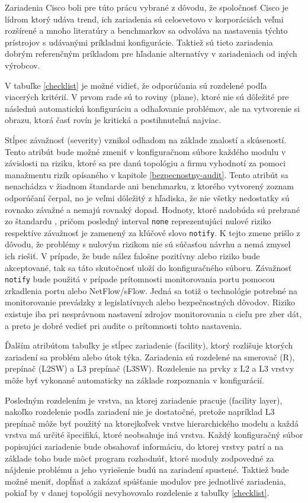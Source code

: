 Zariadenia Cisco boli pre túto prácu vybrané z dôvodu, že spoločnosť Cisco je lídrom ktorý udáva trend, ich zariadenia sú celosvetovo v korporáciách veľmi rozšírené a mnoho literatúry a benchmarkov sa odvoláva na nastavenia týchto prístrojov s udávanými príkladmi konfigurácie. Taktiež sú tieto zariadenia dobrým referenčným príkladom pre hľadanie alternatívy v zariadeniach od iných výrobcov.

V tabuľke \ref{checklist} je možné vidieť, že odporúčania sú rozdelené podľa viacerých kritérií. V prvom rade sú to roviny (plane), ktoré nie sú dôležité pre následnú automatickú konfiguráciu a odhaľovanie problémov, ale na vytvorenie si obrazu, ktorá časť rovín je kritická a postihnuteľná najviac. 

Stĺpec závažnosť (severity) vznikol odhadom na základe znalostí a skúseností. Tento atribút bude možné zmeniť v konfiguračnom súbore každého modulu v závislosti na riziku, ktoré sa pre danú topológiu a firmu vyhodnotí za pomoci manažmentu rizík opísaného v kapitole \ref{bezpecnostny-audit}. Tento atribút sa nenachádza v žiadnom štandarde ani benchmarku, z ktorého vytvorený zoznam odporúčaní čerpal, no je veľmi dôležitý z hľadiska, že nie všetky nedostatky sú rovnako závažné a nemajú rovnaký dopad. Hodnoty, ktoré nadobúda sú prebrané zo štandardu , pričom posledný interval \texttt{none} reprezentujúci nulové riziko respektíve závažnosť je zamenený za kľúčové slovo \texttt{notify}. K tejto zmene prišlo z dôvodu, že problémy s nulovým rizikom nie sú súčasťou návrhu a nemá zmysel ich riešiť. V prípade, že bude nález falošne pozitívny alebo riziko bude akceptované, tak sa táto skutočnosť uloží do konfiguračného súboru. Závažnosť \texttt{notify} bude použitá v prípade prítomnosti monitorovania portu pomocou zrkadlenia portu alebo NetFlow/sFlow. Jedná sa totiž o technológie potrebné na monitorovanie prevádzky z legislatívnych alebo bezpečnostných dôvodov. Riziko existuje iba pri nesprávnom nastavení zdrojov monitorovania a cieľu pre zber dát, a preto je dobré vedieť pri audite o prítomnosti tohto nastavenia.
 

Ďalším atribútom tabuľky je stĺpec zariadenie (facility), ktorý rozlišuje ktorých zariadení sa problém alebo útok týka. Zariadenia sú rozdelené na smerovač (R), prepínač (L2SW) a L3 prepínač (L3SW). Rozdelenie na prvky z L2 a L3 vrstvy môže byť vykonané automaticky na základe rozpoznania v konfigurácií.

Posledným rozdelením je vrstva, na ktorej zariadenie pracuje (facility layer), nakoľko rozdelenie podľa zariadení nie je dostatočné, pretože napríklad L3 prepínač môže byť použitý na ktorejkoľvek vrstve hierarchického modelu a každá vrstva má určité špecifiká, ktoré neobsahuje iná vrstva. Každý konfiguračný súbor popisujúci zariadenie bude obsahovať informáciu, do ktorej vrstvy patrí a na základe toho bude môcť program rozhodnúť, ktoré moduly zodpovedné za nájdenie problému a jeho vyriešenie budú na zariadení spustené. Taktiež bude možné meniť, dopĺňať a zakázať spúšťanie modulov pre jednotlivé zariadenia, pokiaľ by v danej topológii nevyhovovalo rozdelenie z tabuľky \ref{checklist}. 

